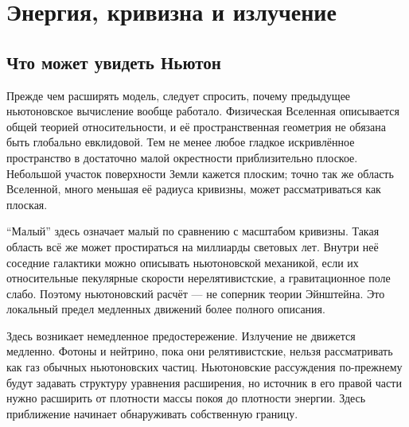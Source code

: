 \chapter{Энергия, кривизна и излучение}


\section{Что может увидеть Ньютон}

Прежде чем расширять модель, следует спросить, почему предыдущее ньютоновское вычисление вообще работало. Физическая Вселенная описывается общей теорией относительности, и её пространственная геометрия не обязана быть глобально евклидовой. Тем не менее любое гладкое искривлённое пространство в достаточно малой окрестности приблизительно плоское. Небольшой участок поверхности Земли кажется плоским; точно так же область Вселенной, много меньшая её радиуса кривизны, может рассматриваться как плоская.

``Малый'' здесь означает малый по сравнению с масштабом кривизны. Такая область всё же может простираться на миллиарды световых лет. Внутри неё соседние галактики можно описывать ньютоновской механикой, если их относительные пекулярные скорости нерелятивистские, а гравитационное поле слабо. Поэтому ньютоновский расчёт — не соперник теории Эйнштейна. Это локальный предел медленных движений более полного описания.

Здесь возникает немедленное предостережение. Излучение не движется медленно. Фотоны и нейтрино, пока они релятивистские, нельзя рассматривать как газ обычных ньютоновских частиц. Ньютоновские рассуждения по-прежнему будут задавать структуру уравнения расширения, но источник в его правой части нужно расширить от плотности массы покоя до плотности энергии. Здесь приближение начинает обнаруживать собственную границу.

